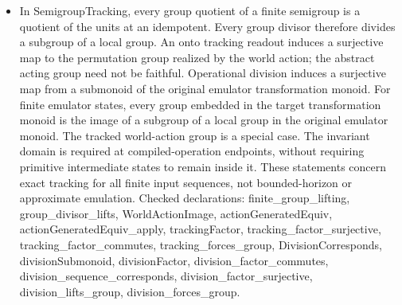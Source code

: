 \documentclass[11pt,a4paper]{article}
\newcommand{\lean}[1]{{\ttfamily\small
  \let\leanunderscore\_\def\_{\leanunderscore\allowbreak}#1}}
\begin{document}
\begin{itemize}[leftmargin=1.4em,itemsep=1pt]
{Checked declarations: \lean{Corner}, \lean{cornerValue}, \lean{cornerValue\_one}, \lean{cornerValue\_mul}, \lean{cornerValue\_injective}, \lean{idempotent\_map\_eq\_one}, \lean{cornerGroupMap}, \lean{cornerGroupMap\_apply}, \lean{groupIdentity}, \lean{groupToCornerValue}, \lean{groupToCorner}, \lean{groupToCorner\_value}, \lean{cornerGroupMap\_groupToCorner}, \lean{groupToCorner\_injective}, \lean{idempotent\_unit\_eq\_one}, \lean{group\_identity\_unique}, \lean{mapWrite}, \lean{cornerCongr}, \lean{cornerGroupCongr}, \lean{bijective\_comp\_iff}, \lean{unit\_iff\_bijective}, \lean{irreversible\_ideal}, \lean{card\_image\_comp\_le\_left}, \lean{card\_image\_comp\_le\_right}, \lean{kernel\_factorization}, \lean{Retained}, \lean{write\_fixes\_range}, \lean{cornerAction}, \lean{cornerAction\_apply}, \lean{corner\_ext}, \lean{cornerAction\_injective}, \lean{cornerPerm}, \lean{corner\_group\_faithful}, \lean{Equivariant}, \lean{writes\_orbit}, \lean{conjugation}, \lean{equivariant\_run}, \lean{conjugation\_generated}, \lean{generatedConjugation}, \lean{Tracks}, \lean{track}, \lean{track\_on\_range}, \lean{track\_mul}, \lean{track\_one}, \lean{trackingHom}, \lean{tracking\_kernel}, \lean{Divides}, \lean{Divides.realizedUpdate}, \lean{Divides.run\_comm}, \lean{Divides.realizedRun\_val}, \lean{Divides.refl}, \lean{Divides.trans}.\par}
\item {\raggedright In \lean{SemigroupTracking}, every group quotient of a finite semigroup is a quotient of the units at an idempotent. Every group divisor therefore divides a subgroup of a local group. An onto tracking readout induces a surjective map to the permutation group realized by the world action; the abstract acting group need not be faithful. Operational division induces a surjective map from a submonoid of the original emulator transformation monoid. For finite emulator states, every group embedded in the target transformation monoid is the image of a subgroup of a local group in the original emulator monoid. The tracked world-action group is a special case. The invariant domain is required at compiled-operation endpoints, without requiring primitive intermediate states to remain inside it. These statements concern exact tracking for all finite input sequences, not bounded-horizon or approximate emulation.
Checked declarations: \lean{finite\_group\_lifting}, \lean{group\_divisor\_lifts}, \lean{WorldActionImage}, \lean{actionGeneratedEquiv}, \lean{actionGeneratedEquiv\_apply}, \lean{trackingFactor}, \lean{tracking\_factor\_surjective}, \lean{tracking\_factor\_commutes}, \lean{tracking\_forces\_group}, \lean{DivisionCorresponds}, \lean{divisionSubmonoid}, \lean{divisionFactor}, \lean{division\_factor\_commutes}, \lean{division\_sequence\_corresponds}, \lean{division\_factor\_surjective}, \lean{division\_lifts\_group}, \lean{division\_forces\_group}.\par}

\end{itemize}
\end{document}

